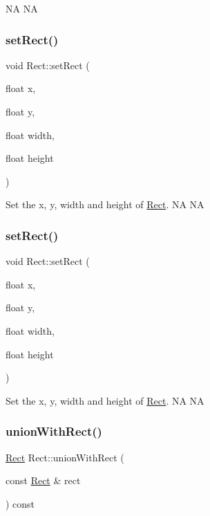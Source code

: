 NA  NA \mbox{\label{classRect_ab9d3a5d029bc97ff8763c9e2ec7ed2f7}} 
\subsubsection{\texorpdfstring{set\+Rect()}{setRect()}\hspace{0.1cm}{\footnotesize\ttfamily [1/2]}}
{\footnotesize\ttfamily void Rect\+::set\+Rect (\begin{DoxyParamCaption}\item[{float}]{x,  }\item[{float}]{y,  }\item[{float}]{width,  }\item[{float}]{height }\end{DoxyParamCaption})}

Set the x, y, width and height of \hyperlink{classRect}{Rect}.  NA  NA \mbox{\label{classRect_ab9d3a5d029bc97ff8763c9e2ec7ed2f7}} 
\subsubsection{\texorpdfstring{set\+Rect()}{setRect()}\hspace{0.1cm}{\footnotesize\ttfamily [2/2]}}
{\footnotesize\ttfamily void Rect\+::set\+Rect (\begin{DoxyParamCaption}\item[{float}]{x,  }\item[{float}]{y,  }\item[{float}]{width,  }\item[{float}]{height }\end{DoxyParamCaption})}

Set the x, y, width and height of \hyperlink{classRect}{Rect}.  NA  NA \mbox{\label{classRect_ab51a6068a355a826faa0bd03c381f1fa}} 
\subsubsection{\texorpdfstring{union\+With\+Rect()}{unionWithRect()}\hspace{0.1cm}{\footnotesize\ttfamily [1/2]}}
{\footnotesize\ttfamily \hyperlink{classRect}{Rect} Rect\+::union\+With\+Rect (\begin{DoxyParamCaption}\item[{const \hyperlink{classRect}{Rect} \&}]{rect }\end{DoxyParamCaption}) const}


